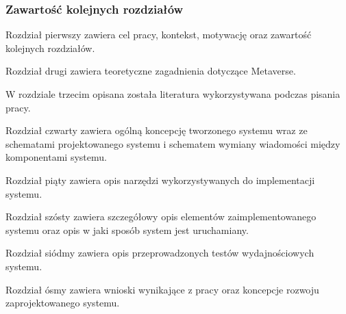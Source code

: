 \subsubsection{Zawartość kolejnych rozdziałów}

Rozdział pierwszy zawiera cel pracy, kontekst, motywację oraz zawartość kolejnych rozdziałów.

Rozdział drugi zawiera teoretyczne zagadnienia dotyczące Metaverse.  

W rozdziale trzecim opisana została literatura wykorzystywana podczas pisania pracy.

Rozdział czwarty zawiera ogólną koncepcję tworzonego systemu wraz ze schematami projektowanego systemu i schematem wymiany wiadomości między komponentami systemu.

Rozdział piąty zawiera opis narzędzi wykorzystywanych do implementacji systemu.

Rozdział szósty zawiera szczegółowy opis elementów zaimplementowanego systemu oraz opis  w jaki sposób system jest uruchamiany.

Rozdział siódmy zawiera opis przeprowadzonych testów wydajnościowych systemu.

Rozdział ósmy zawiera wnioski wynikające z pracy oraz koncepcje rozwoju zaprojektowanego systemu.